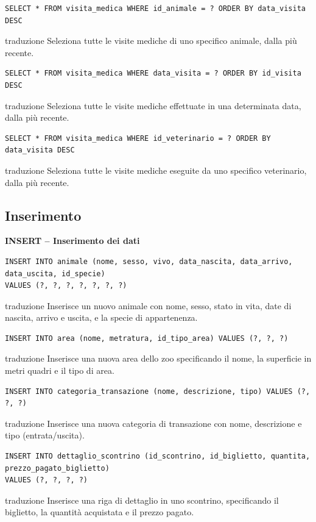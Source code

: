 \documentclass[12pt,a4paper]{report}
\begin{document}
\begin{lstlisting}[style=sqlstyle]
SELECT * FROM visita_medica WHERE id_animale = ? ORDER BY data_visita DESC
\end{lstlisting}
traduzione {Seleziona tutte le visite mediche di uno specifico animale, dalla più recente.}

\begin{lstlisting}[style=sqlstyle]
SELECT * FROM visita_medica WHERE data_visita = ? ORDER BY id_visita DESC
\end{lstlisting}
traduzione {Seleziona tutte le visite mediche effettuate in una determinata data, dalla più recente.}

\begin{lstlisting}[style=sqlstyle]
SELECT * FROM visita_medica WHERE id_veterinario = ? ORDER BY data_visita DESC
\end{lstlisting}
traduzione {Seleziona tutte le visite mediche eseguite da uno specifico veterinario, dalla più recente.}

\subsection{Inserimento}
\newpage
\textbf{INSERT -- Inserimento dei dati}

\begin{lstlisting}[style=sqlstyle]
INSERT INTO animale (nome, sesso, vivo, data_nascita, data_arrivo, data_uscita, id_specie)
VALUES (?, ?, ?, ?, ?, ?, ?)
\end{lstlisting}
traduzione {Inserisce un nuovo animale con nome, sesso, stato in vita, date di nascita, arrivo e uscita, e la specie di appartenenza.}

\begin{lstlisting}[style=sqlstyle]
INSERT INTO area (nome, metratura, id_tipo_area) VALUES (?, ?, ?)
\end{lstlisting}
traduzione {Inserisce una nuova area dello zoo specificando il nome, la superficie in metri quadri e il tipo di area.}

\begin{lstlisting}[style=sqlstyle]
INSERT INTO categoria_transazione (nome, descrizione, tipo) VALUES (?, ?, ?)
\end{lstlisting}
traduzione {Inserisce una nuova categoria di transazione con nome, descrizione e tipo (entrata/uscita).}

\begin{lstlisting}[style=sqlstyle]
INSERT INTO dettaglio_scontrino (id_scontrino, id_biglietto, quantita, prezzo_pagato_biglietto)
VALUES (?, ?, ?, ?)
\end{lstlisting}
traduzione {Inserisce una riga di dettaglio in uno scontrino, specificando il biglietto, la quantità acquistata e il prezzo pagato.}
\end{document}

